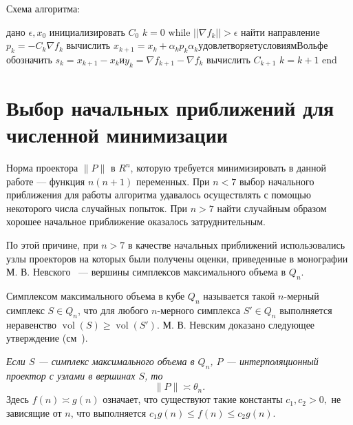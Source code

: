 \documentclass[12pt, a4paper]{extarticle}
\begin{document}
Схема алгоритма:
\begin{flushleft}
дано $ \epsilon , x_{0} $ \newline
инициализировать $C_{0}$ \newline
$ k=0$ \newline
while $||\nabla f_{k}||>\epsilon$ \newline
найти направление $p_{k}=-C_{k}\nabla f_{k}$ \newline
вычислить $x_{k+1}=x_{k}+\alpha _{k}p_{k} \alpha _{k} удовлетворяет условиям Вольфе $ \newline
обозначить $s_{k}=x_{k+1}-x_{k} и y_{k}=\nabla f_{k+1}-\nabla f_{k} $ \newline
вычислить $C_{k+1}$ \newline
$ k=k+1$ \newline
end \newline
\end{flushleft}


\section{Выбор начальных приближений для численной минимизации} 

Норма проектора $\|P\|$ в $R^n$, которую требуется минимизировать в данной работе --- функция $n(n+1)$ переменных. При $n<7$ выбор начального приближения для работы алгоритма 
удавалось осуществлять с помощью некоторого числа случайных попыток.
При $n>7$ найти случайным образом хорошее начальное приближение оказалось затруднительным.

По этой причине, при $n>7$ в качестве начальных приближений использовались узлы проекторов
на которых были получены оценки, приведенные в монографии М. В. Невского~\cite{10} ---
вершины симплексов максимального объема в $Q_n$.

Симплексом максимального объема в кубе $Q_n$ называется 
такой $n$-мерный симплекс $S\in Q_n$, что для любого $n$-мерного симплекса $S' \in Q_n$ 
выполняется неравенство $\operatorname{vol}(S)\geq \operatorname{vol}(S')$.
М. В. Невским доказано следующее утверждение (см~\cite{1}).

{\it Если $S$ --- симплекс максимального объема в $Q_n$, $P$ --- интерполяционный 
проектор с узлами в вершинах $S$, то
$$
\|P\|\asymp\theta_n.
$$ 
}
Здесь $f(n)\asymp g(n)$ означает, что существуют такие константы $c_1,c_2>0,$
не зависящие от $n$, что выполняется 
$c_1 g(n)\leq f(n)\leq c_2 g(n)$. 
\end{document}
